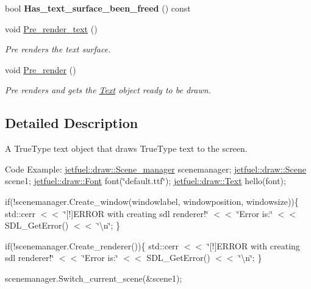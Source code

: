 \begin{DoxyCompactItemize}
\item 
\mbox{\label{classjetfuel_1_1draw_1_1Text_a0968c175395924bca3cc2e543adce3e9}} 
bool {\bfseries Has\+\_\+text\+\_\+surface\+\_\+been\+\_\+freed} () const
\item 
void \hyperlink{classjetfuel_1_1draw_1_1Text_a5ce2072f87c6e02dfbc363e1c489cc3b}{Pre\+\_\+render\+\_\+text} ()
\begin{DoxyCompactList}\small\item\em Pre renders the text surface. \end{DoxyCompactList}\item 
void \hyperlink{classjetfuel_1_1draw_1_1Text_ae25b3503ec6fcf36aaeebf4e08612394}{Pre\+\_\+render} ()
\begin{DoxyCompactList}\small\item\em Pre renders and gets the \hyperlink{classjetfuel_1_1draw_1_1Text}{Text} object ready to be drawn. \end{DoxyCompactList}\end{DoxyCompactItemize}


\subsection{Detailed Description}
A True\+Type text object that draws True\+Type text to the screen.

Code Example\+: \hyperlink{classjetfuel_1_1draw_1_1Scene__manager}{jetfuel\+::draw\+::\+Scene\+\_\+manager} scenemanager; \hyperlink{classjetfuel_1_1draw_1_1Scene}{jetfuel\+::draw\+::\+Scene} scene1; \hyperlink{classjetfuel_1_1draw_1_1Font}{jetfuel\+::draw\+::\+Font} font(\char`\"{}default.\+ttf\char`\"{}); \hyperlink{classjetfuel_1_1draw_1_1Text}{jetfuel\+::draw\+::\+Text} hello(font);

if(!scenemanager.Create\+\_\+window(windowlabel, windowposition, windowsize))\{ std\+::cerr $<$$<$ \char`\"{}\mbox{[}!\mbox{]}\+E\+R\+R\+O\+R with creating sdl renderer!\char`\"{} $<$$<$ \char`\"{}\+Error is\+:\char`\"{} $<$$<$ S\+D\+L\+\_\+\+Get\+Error() $<$$<$ \char`\"{}\textbackslash{}n\char`\"{}; \}

if(!scenemanager.Create\+\_\+renderer())\{ std\+::cerr $<$$<$ \char`\"{}\mbox{[}!\mbox{]}\+E\+R\+R\+O\+R with creating sdl renderer!\char`\"{} $<$$<$ \char`\"{}\+Error is\+:\char`\"{} $<$$<$ S\+D\+L\+\_\+\+Get\+Error() $<$$<$ \char`\"{}\textbackslash{}n\char`\"{}; \}

scenemanager.\+Switch\+\_\+current\+\_\+scene(\&scene1);

